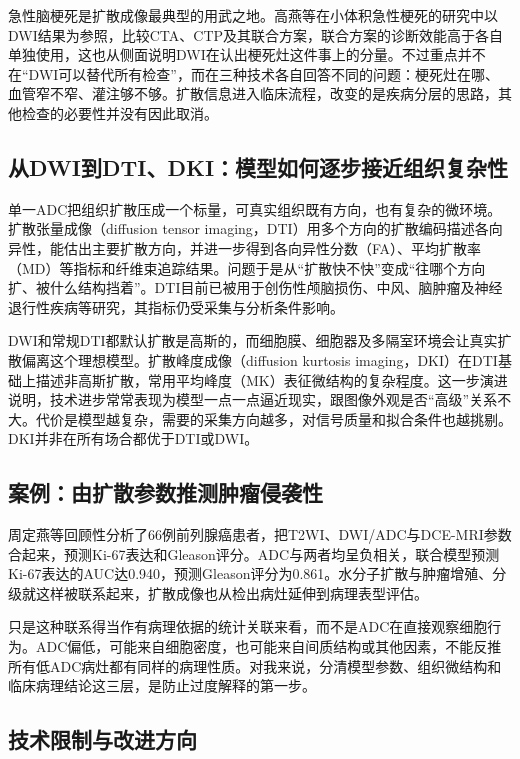 急性脑梗死是扩散成像最典型的用武之地。高燕等在小体积急性梗死的研究中以DWI结果为参照，比较CTA、CTP及其联合方案，联合方案的诊断效能高于各自单独使用，这也从侧面说明DWI在认出梗死灶这件事上的分量\cite{gao2025infarct}。不过重点并不在“DWI可以替代所有检查”，而在三种技术各自回答不同的问题：梗死灶在哪、血管窄不窄、灌注够不够。扩散信息进入临床流程，改变的是疾病分层的思路，其他检查的必要性并没有因此取消。

\subsection{从DWI到DTI、DKI：模型如何逐步接近组织复杂性}

单一ADC把组织扩散压成一个标量，可真实组织既有方向，也有复杂的微环境。扩散张量成像（diffusion tensor imaging，DTI）用多个方向的扩散编码描述各向异性，能估出主要扩散方向，并进一步得到各向异性分数（FA）、平均扩散率（MD）等指标和纤维束追踪结果。问题于是从“扩散快不快”变成“往哪个方向扩、被什么结构挡着”。DTI目前已被用于创伤性颅脑损伤、中风、脑肿瘤及神经退行性疾病等研究，其指标仍受采集与分析条件影响\cite{zeng2005dwi,wang2024dti}。

DWI和常规DTI都默认扩散是高斯的，而细胞膜、细胞器及多隔室环境会让真实扩散偏离这个理想模型。扩散峰度成像（diffusion kurtosis imaging，DKI）在DTI基础上描述非高斯扩散，常用平均峰度（MK）表征微结构的复杂程度\cite{zeng2011dki}。这一步演进说明，技术进步常常表现为模型一点一点逼近现实，跟图像外观是否“高级”关系不大。代价是模型越复杂，需要的采集方向越多，对信号质量和拟合条件也越挑剔。DKI并非在所有场合都优于DTI或DWI。

\subsection{案例：由扩散参数推测肿瘤侵袭性}

周定燕等回顾性分析了66例前列腺癌患者，把T2WI、DWI/ADC与DCE-MRI参数合起来，预测Ki-67表达和Gleason评分。ADC与两者均呈负相关，联合模型预测Ki-67表达的AUC达0.940，预测Gleason评分为0.861\cite{zhou2024prostate}。水分子扩散与肿瘤增殖、分级就这样被联系起来，扩散成像也从检出病灶延伸到病理表型评估。

只是这种联系得当作有病理依据的统计关联来看，而不是ADC在直接观察细胞行为。ADC偏低，可能来自细胞密度，也可能来自间质结构或其他因素，不能反推所有低ADC病灶都有同样的病理性质。对我来说，分清模型参数、组织微结构和临床病理结论这三层，是防止过度解释的第一步。

\subsection{技术限制与改进方向}

